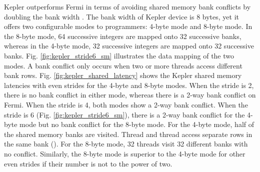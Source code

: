 \documentclass[10pt,journal,compsoc]{IEEEtran}
\theoremstyle{definition}
\begin{document}
\begin{figure*}
\vspace{-1em}
  \caption{Latency of Kepler Shared Memory with bank conflict: 4-byte mode v.s. 8-byte mode.}
  \label{fig:kepler_shared_latency}
\end{figure*}

Kepler outperforms Fermi in terms of avoiding shared memory bank conflicts by doubling the bank width \cite{micikevicius2012gpu}. The bank width of Kepler device is 8 bytes, yet it offers two configurable modes to programmers: 4-byte mode and 8-byte mode. In the 8-byte mode, 64 successive integers are mapped onto 32 successive banks, whereas in the 4-byte mode, 32 successive integers are mapped onto 32 successive banks. Fig. \ref{fig:kepler_stride6_sm} illustrates the data mapping of the two modes. A bank conflict only occurs when two or more threads access different bank rows.
Fig. \ref{fig:kepler_shared_latency} shows the Kepler shared memory latencies with even strides for the 4-byte and 8-byte modes. When the stride is 2, there is no bank conflict in either mode, whereas there is a 2-way bank conflict on Fermi. When the stride is 4, both modes show a 2-way bank conflict. When the stride is 6 (Fig. \ref{fig:kepler_stride6_sm}), there is a 2-way bank conflict for the 4-byte mode but no bank conflict for the 8-byte mode. For the 4-byte mode, half of the shared memory banks are visited. Thread  and thread  access separate rows in the same bank (). For the 8-byte mode, 32 threads visit 32 different banks with no conflict. Similarly, the 8-byte mode is superior to the 4-byte mode for other even strides if their number is not to the power of two.
\end{document}
